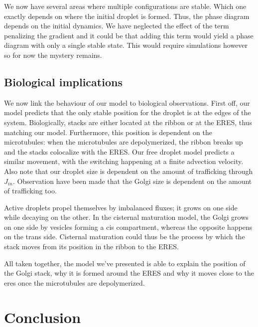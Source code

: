 \documentclass{Dissertate}
\begin{document}
We now have several areas where multiple configurations are stable.
Which one exactly depends on where the initial droplet is formed. Thus,
the phase diagram depends on the initial dynamics. We have neglected the
effect of the term penalizing the gradient and it could be that adding
this term would yield a phase diagram with only a single stable state.
This would require simulations however so for now the mystery remains.

\hypertarget{biological-implications}{%
\section{Biological implications}\label{biological-implications}}

We now link the behaviour of our model to biological observations. First
off, our model predicts that the only stable position for the droplet is
at the edges of the system. Biologically, stacks are either located at
the ribbon or at the ERES, thus matching our model. Furthermore, this
position is dependent on the microtubules: when the microtubules are
depolymerized, the ribbon breaks up and the stacks colocalize with the
ERES. Our free droplet model predicts a similar movement, with the
switching happening at a finite advection velocity. Also note that our
droplet size is dependent on the amount of trafficking through
\(J_{in}\). Observation have been made that the Golgi size is dependent
on the amount of trafficking too.

Active droplets propel themselves by imbalanced fluxes; it grows on one
side while decaying on the other. In the cisternal maturation model, the
Golgi grows on one side by vesicles forming a cis compartment, whereas
the opposite happens on the trans side. Cisternal maturation could thus
be the process by which the stack moves from its position in the ribbon
to the ERES.

All taken together, the model we've presented is able to explain the
position of the Golgi stack, why it is formed around the ERES and why it
moves close to the eres once the microtubules are depolymerized.

\hypertarget{conclusion-1}{%
\chapter{Conclusion}\label{conclusion-1}}
\end{document}

